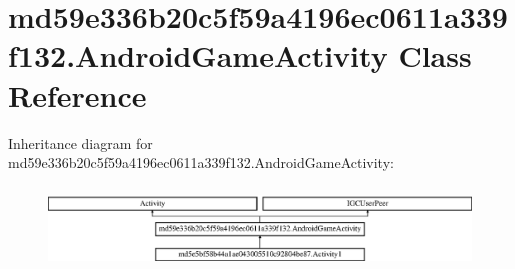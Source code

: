 \hypertarget{classmd59e336b20c5f59a4196ec0611a339f132_1_1AndroidGameActivity}{}\section{md59e336b20c5f59a4196ec0611a339f132.\+Android\+Game\+Activity Class Reference}
\label{classmd59e336b20c5f59a4196ec0611a339f132_1_1AndroidGameActivity}
Inheritance diagram for md59e336b20c5f59a4196ec0611a339f132.\+Android\+Game\+Activity\+:\begin{figure}[H]
\begin{center}
\leavevmode
\includegraphics[height=2.187500cm]{classmd59e336b20c5f59a4196ec0611a339f132_1_1AndroidGameActivity}
\end{center}
\end{figure}
